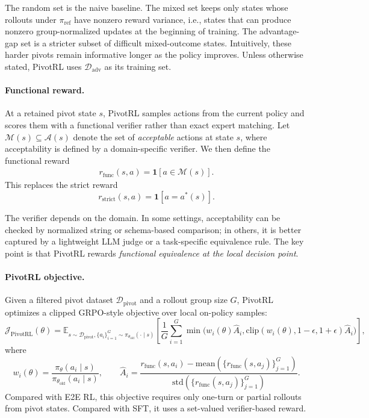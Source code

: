 The random set is the naive baseline. The mixed set keeps only states whose rollouts under $\pi_{\mathrm{ref}}$ have nonzero reward variance, i.e., states that can produce nonzero group-normalized updates at the beginning of training. The advantage-gap set is a stricter subset of difficult mixed-outcome states. Intuitively, these harder pivots remain informative longer as the policy improves. Unless otherwise stated, PivotRL uses $\mathcal{D}_{\mathrm{adv}}$ as its training set.

\paragraph{Functional reward.}
At a retained pivot state $s$, PivotRL samples actions from the current policy and scores them with a functional verifier rather than exact expert matching. Let $\mathcal{M}(s)\subseteq\mathcal{A}(s)$ denote the set of \emph{acceptable} actions at state $s$, where acceptability is defined by a domain-specific verifier. We then define the functional reward
\begin{align}\label{eq:func_reward}
r_{\mathrm{func}}(s,a)=\mathbf{1}[a\in\mathcal{M}(s)].
\end{align}
This replaces the strict reward
\[
r_{\mathrm{strict}}(s,a)=\mathbf{1}[a=a^*(s)].
\]

The verifier depends on the domain. In some settings, acceptability can be checked by normalized string or schema-based comparison; in others, it is better captured by a lightweight LLM judge or a task-specific equivalence rule. The key point is that PivotRL rewards \emph{functional equivalence at the local decision point}.

\paragraph{PivotRL objective.}
Given a filtered pivot dataset $\mathcal{D}_{\mathrm{pivot}}$ and a rollout group size $G$, PivotRL optimizes a clipped GRPO-style objective over local on-policy samples:
\[
\mathcal{J}_{\mathrm{PivotRL}}(\theta)
=
\mathbb{E}_{s\sim\mathcal{D}_{\mathrm{pivot}},\{a_i\}_{i=1}^G\sim\pi_{\theta_{\mathrm{old}}}(\cdot\mid s)}
\left[
\frac{1}{G}
\sum_{i=1}^G
\min\!\Big(
w_i(\theta)\hat{A}_i,
\mathrm{clip}(w_i(\theta),1-\epsilon,1+\epsilon)\hat{A}_i
\Big)
\right],
\]
where
\[
w_i(\theta)=\frac{\pi_\theta(a_i\mid s)}{\pi_{\theta_{\mathrm{old}}}(a_i\mid s)},
\qquad
\hat{A}_i=
\frac{
r_{\mathrm{func}}(s,a_i)-\mathrm{mean}\!\left(\{r_{\mathrm{func}}(s,a_j)\}_{j=1}^G\right)
}{
\mathrm{std}\!\left(\{r_{\mathrm{func}}(s,a_j)\}_{j=1}^G\right)
}.
\]
Compared with E2E RL, this objective requires only one-turn or partial rollouts from pivot states. Compared with SFT, it uses a set-valued verifier-based reward.

